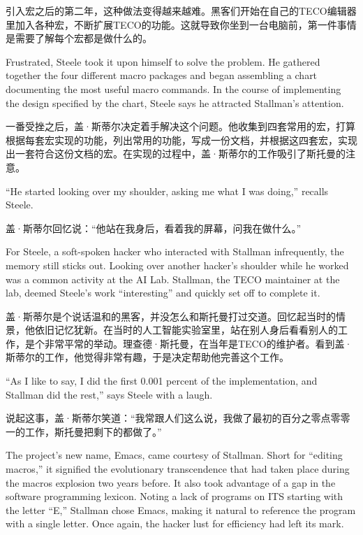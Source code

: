 \ifdefined\chs
引入宏之后的第二年，这种做法变得越来越难。黑客们开始在自己的TECO编辑器里加入各种宏，不断扩展TECO的功能。这就导致你坐到一台电脑前，第一件事情是需要了解每个宏都是做什么的。
\fi

\ifdefined\eng
Frustrated, Steele took it upon himself to solve the problem. He gathered together the four different macro packages and began assembling a chart documenting the most useful macro commands. In the course of implementing the design specified by the chart, Steele says he attracted Stallman's attention.
\fi

\ifdefined\chs
一番受挫之后，盖·斯蒂尔决定着手解决这个问题。他收集到四套常用的宏，打算根据每套宏实现的功能，列出常用的功能，写成一份文档，并根据这四套宏，实现出一套符合这份文档的宏。在实现的过程中，盖·斯蒂尔的工作吸引了斯托曼的注意。
\fi

\ifdefined\eng
``He started looking over my shoulder, asking me what I was doing,'' recalls Steele.
\fi

\ifdefined\chs
盖·斯蒂尔回忆说：``他站在我身后，看着我的屏幕，问我在做什么。''
\fi

\ifdefined\eng
For Steele, a soft-spoken hacker who interacted with Stallman infrequently, the memory still sticks out. Looking over another hacker's shoulder while he worked was a common activity at the AI Lab. Stallman, the TECO maintainer at the lab, deemed Steele's work ``interesting'' and quickly set off to complete it.
\fi

\ifdefined\chs
盖·斯蒂尔是个说话温和的黑客，并没怎么和斯托曼打过交道。回忆起当时的情景，他依旧记忆犹新。在当时的人工智能实验室里，站在别人身后看看别人的工作，是个非常平常的举动。理查德·斯托曼，在当年是TECO的维护者。看到盖·斯蒂尔的工作，他觉得非常有趣，于是决定帮助他完善这个工作。
\fi

\ifdefined\eng
``As I like to say, I did the first 0.001 percent of the implementation, and Stallman did the rest,'' says Steele with a laugh.
\fi

\ifdefined\chs
说起这事，盖·斯蒂尔笑道：``我常跟人们这么说，我做了最初的百分之零点零零一的工作，斯托曼把剩下的都做了。''
\fi

\ifdefined\eng
The project's new name, Emacs, came courtesy of Stallman. Short for ``editing macros,'' it signified the evolutionary transcendence that had taken place during the macros explosion two years before. It also took advantage of a gap in the software programming lexicon. Noting a lack of programs on ITS starting with the letter ``E,'' Stallman chose Emacs, making it natural to reference the program with a single letter. Once again, the hacker lust for efficiency had left its mark.
\fi

